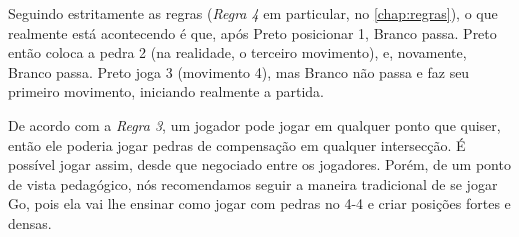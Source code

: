 Seguindo estritamente as regras (\emph{Regra 4} em particular, no \autoref{chap:regras}), o que realmente está acontecendo é que, após Preto posicionar 1, Branco passa. Preto então coloca a pedra 2 (na realidade, o terceiro movimento), e, novamente, Branco passa. Preto joga 3 (movimento 4), mas Branco não passa e faz seu primeiro movimento, iniciando realmente a partida.

De acordo com a \emph{Regra 3}, um jogador pode jogar em qualquer ponto que quiser, então ele poderia jogar pedras de compensação em qualquer intersecção. É possível jogar assim, desde que negociado entre os jogadores. Porém, de um ponto de vista pedagógico, nós recomendamos seguir a maneira tradicional de se jogar Go, pois ela vai lhe ensinar como jogar com pedras no 4-4 e criar posições fortes e densas.
